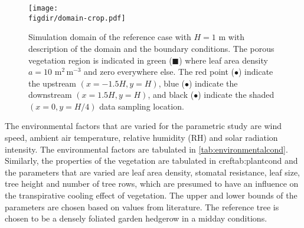 	\begin{figure}[h]
	\centering
	\texttt{[image: \\figdir/domain-crop.pdf]}
	\caption{Simulation domain of the reference case with $H=1$ m with description of the domain and the boundary conditions. The porous vegetation region is indicated in green ({\color{flatuidarkgreen}$\blacksquare$}) where leaf area density $a=10$ m$^2$\,m$^{-3}$ and zero everywhere else. The red point ({\color{flatuidarkred}$\bullet$}) indicate the upstream $(x=-1.5H,y=H)$, blue ({\color{flatuidarkblue}$\bullet$}) indicate the downstream $(x=1.5H,y=H)$, and black ($\bullet$) indicate the shaded $(x=0,y=H/4)$ data sampling location.}
	\label{fig:domain}
	\end{figure}

The environmental factors that are varied for the parametric study are wind speed, ambient air temperature, relative humidity (RH) and solar radiation intensity. The environmental factors are tabulated in \cref{tab:environmentalcond}.  Similarly, the properties of the vegetation are tabulated in cref{tab:plantcond} and the parameters that are varied are leaf area density, stomatal resistance, leaf size, tree height and number of tree rows, which are presumed to have an influence on the transpirative cooling effect of vegetation. The upper and lower bounds of the parameters are chosen based on values from literature. The reference tree is chosen to be a densely foliated garden hedgerow in a midday conditions. 







